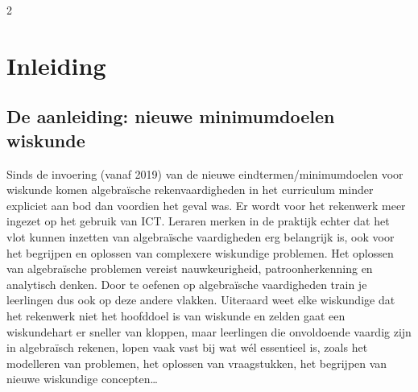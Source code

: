 

\startcontents[inhoudloep]	%

\begin{multicols}{2}
	
	\inhoudstafelloep			%
	
\section{Inleiding}
\subsection{De aanleiding: nieuwe minimumdoelen wiskunde}
Sinds de invoering (vanaf 2019) van de nieuwe eindtermen/minimumdoelen voor wiskunde komen algebraïsche rekenvaardigheden in het curriculum minder expliciet aan bod dan voordien het geval was. Er wordt voor het rekenwerk meer ingezet op het gebruik van ICT. Leraren merken in de praktijk echter dat het vlot kunnen inzetten van algebraïsche vaardigheden erg belangrijk is, ook voor het begrijpen en oplossen van complexere wiskundige problemen. Het oplossen van algebraïsche problemen vereist nauwkeurigheid, patroonherkenning en analytisch denken. Door te oefenen op algebraïsche vaardigheden train je leerlingen dus ook op deze andere vlakken. Uiteraard weet elke wiskundige dat het rekenwerk niet het hoofddoel is van wiskunde en zelden gaat een wiskundehart er sneller van kloppen, maar leerlingen die onvoldoende vaardig zijn in algebraïsch rekenen, lopen vaak vast bij wat wél essentieel is, zoals het modelleren van problemen, het oplossen van vraagstukken, het begrijpen van nieuwe wiskundige concepten\ldots


\end{multicols}

